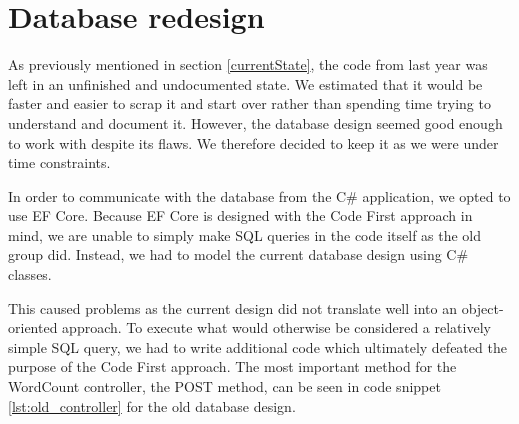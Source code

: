 \section{Database redesign}

As previously mentioned in section \ref{currentState}, the code from last year was left in an unfinished and undocumented state. We estimated that it would be faster and easier to scrap it and start over rather than spending time trying to understand and document it.
However, the database design seemed good enough to work with despite its flaws. 
We therefore decided to keep it as we were under time constraints.

In order to communicate with the database from the C\# application, we opted to use EF Core.
Because EF Core is designed with the Code First approach in mind, we are unable to simply make SQL queries in the code itself as the old group did. 
Instead, we had to model the current database design using C\# classes. 

This caused problems as the current design did not translate well into an object-oriented approach.
To execute what would otherwise be considered a relatively simple SQL query, we had to write additional code which ultimately defeated the purpose of the Code First approach. 
The most important method for the WordCount controller, the POST method, can be seen in code snippet \ref{lst:old_controller} for the old database design.

